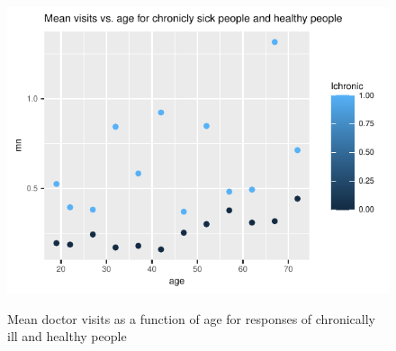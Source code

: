 \documentclass[a4paper,11pt]{article}
\begin{document}
\begin{figure}[h]
	\centering
\includegraphics{../plots/mean_vs_age_and_chronic.pdf}
	\label{fig:scatter_age_and_chronic}
				\caption{Mean doctor visits as a function of age for responses of chronically ill and healthy people}
\end{figure}



\end{document}
